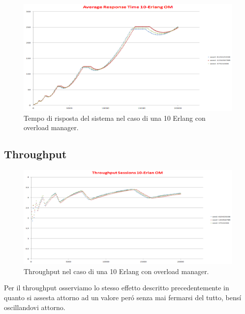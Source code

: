 \begin{figure}[H]
	\begin{center}
	\includegraphics[scale=0.4]{img/er_om_res_time.png}
	\caption[Tempo di risposta del sistema nel caso di una 10 Erlang con overload manager]{Tempo di risposta del sistema nel caso di una 10 Erlang con overload manager.}
	\label{fig:erl_om_res_time}
	\end{center}
\end{figure}

\subsection{Throughput}
\begin{figure}[H]
	\begin{center}
	\includegraphics[scale=0.4]{img/erl_om_t.png}
	\caption[Throughput nel caso di una 10 Erlang con overload manager]{Throughput nel caso di una 10 Erlang con overload manager.}
	\label{fig:erl_om_t}
	\end{center}
\end{figure}
Per il throughput osserviamo lo stesso effetto descritto precedentemente in quanto si assesta attorno ad un valore per\'o senza mai fermarsi del tutto, bens\'i oscillandovi attorno.



